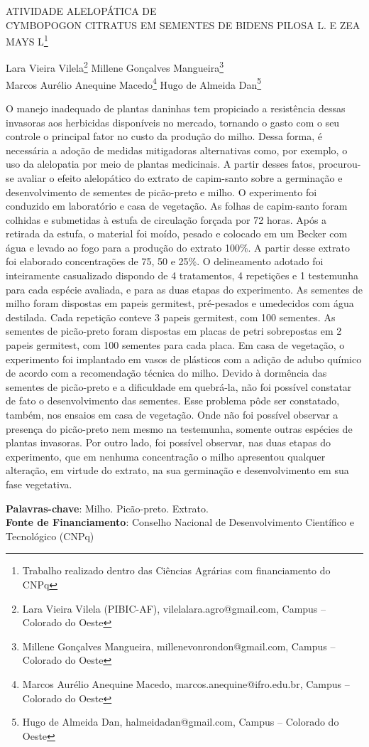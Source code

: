 \documentclass[article,12pt,onesidea,4paper,english,brazil]{abntex2}
\begin{document}
	
	
	\frenchspacing 
	
	\begin{center}
		\LARGE \MakeUppercase{Atividade alelopática de}\\\MakeUppercase{Cymbopogon citratus em sementes de Bidens pilosa L. e Zea mays L}\footnote{Trabalho realizado dentro das Ciências Agrárias com financiamento do CNPq}
		
		\normalsize
		Lara Vieira Vilela\footnote{Lara Vieira Vilela (PIBIC-AF), vilelalara.agro@gmail.com, Campus – Colorado do Oeste} 
		Millene Gonçalves Mangueira\footnote{Millene Gonçalves Mangueira, millenevonrondon@gmail.com, Campus – Colorado do Oeste} \\
		Marcos Aurélio Anequine Macedo\footnote{Marcos Aurélio Anequine Macedo, marcos.anequine@ifro.edu.br, Campus – Colorado do Oeste} 
		Hugo de Almeida Dan\footnote{Hugo de Almeida Dan, halmeidadan@gmail.com, Campus – Colorado do Oeste} 
	\end{center}
	
	\noindent O manejo inadequado de plantas daninhas tem propiciado a resistência dessas invasoras aos herbicidas disponíveis no mercado, tornando o gasto com o seu controle o principal fator no custo da produção do milho. Dessa forma, é necessária a adoção de medidas mitigadoras alternativas como, por exemplo, o uso da alelopatia por meio de plantas medicinais. A partir desses fatos, procurou-se avaliar o efeito alelopático do extrato de capim-santo sobre a germinação e desenvolvimento de sementes de picão-preto e milho. O experimento foi conduzido em laboratório e casa de vegetação. As folhas de capim-santo foram colhidas e submetidas à estufa de circulação forçada por 72 horas. Após a retirada da estufa, o material foi moído, pesado e colocado em um Becker com água e levado ao fogo para a produção do extrato 100\%. A partir desse extrato foi elaborado concentrações de 75, 50 e 25\%. O delineamento adotado foi inteiramente casualizado dispondo de 4 tratamentos, 4 repetições e 1 testemunha para cada espécie avaliada, e para as duas etapas do experimento. As sementes de milho foram dispostas em papeis germitest, pré-pesados e umedecidos com água destilada. Cada repetição conteve 3 papeis germitest, com 100 sementes. As sementes de picão-preto foram dispostas em placas de petri sobrepostas em 2 papeis germitest, com 100 sementes para cada placa. Em casa de vegetação, o experimento foi implantado em vasos de plásticos com a adição de adubo químico de acordo com a recomendação técnica do milho. Devido à dormência das sementes de picão-preto e a dificuldade em quebrá-la, não foi possível constatar de fato o desenvolvimento das sementes. Esse problema pôde ser constatado, também, nos ensaios em casa de vegetação. Onde não foi possível observar a presença do picão-preto nem mesmo na testemunha, somente outras espécies de plantas invasoras. Por outro lado, foi possível observar, nas duas etapas do experimento, que em nenhuma concentração o milho apresentou qualquer alteração, em virtude do extrato, na sua germinação e desenvolvimento em sua fase vegetativa.
	
	\vspace{\onelineskip}
	
	\noindent
	\textbf{Palavras-chave}: Milho. Picão-preto. Extrato. \\
	\textbf{Fonte de Financiamento}: Conselho Nacional de Desenvolvimento Científico e Tecnológico (CNPq)
	
\end{document}
